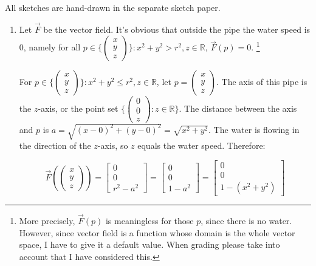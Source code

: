 \begin{exercise}{6}
  All sketches are hand-drawn in the separate sketch paper.
\end{exercise}

\begin{exercise}{8}
  \begin{enumerate}
    \item Let $\vec{F}$ be the vector field. It's obvious that outside the pipe the water speed is 0, namely for all $p \in \{\begin{pmatrix}x\\y\\z\end{pmatrix}\} : x^2 + y^2 > r^2, z \in \mathbb{R}$, $\vec{F}(p) = 0$.
    \footnote{More precisely, $\vec{F}(p)$ is meaningless for those $p$, since there is no water. However, since vector field is a function whose domain is the whole vector space, I have to give it a default value. When grading please take into account that I have considered this.}
    
    For $p \in \{\begin{pmatrix}x\\y\\z\end{pmatrix}\} : x^2 + y^2 \leq r^2, z \in \mathbb{R}$, let $p = \begin{pmatrix}x\\y\\z\end{pmatrix}$. The axis of this pipe is the $z$-axis, or the point set $\{\begin{pmatrix}0\\0\\z\end{pmatrix} : z \in \mathbb{R}\}$. The distance between the axis and $p$ is $a = \sqrt{(x - 0)^2 + (y - 0)^2} = \sqrt{x^2 + y^2}$. The water is flowing in the direction of the $z$-axis, so $z$ equals the water speed. Therefore:
    
    $$\vec{F}(\begin{pmatrix}x\\y\\z\end{pmatrix}) =
      \begin{bmatrix}0\\0\\r^2 - a^2\end{bmatrix} =
      \begin{bmatrix}0\\0\\1 - a^2\end{bmatrix} =
      \begin{bmatrix}0\\0\\1 - (x^2 + y^2)\end{bmatrix}$$
    

\end{enumerate}
\end{exercise}
